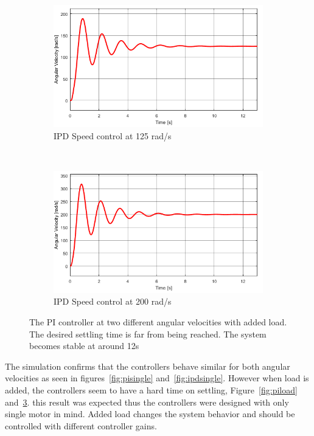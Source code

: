 \begin{figure}[h!]
	\centering
	\begin{subfigure}[b]{0.45\textwidth}
		\includegraphics[width=\textwidth]{graphics/IPD_load125}
		\caption{IPD Speed control at 125 rad/s}
		\label{fig:ipdload125}
	\end{subfigure}
	~ %
	\begin{subfigure}[b]{0.45\textwidth}
		\includegraphics[width=\textwidth]{graphics/IPD_load200}
		\caption{IPD Speed control at 200 rad/s}
		\label{fig:ipdload200}
	\end{subfigure}
	\caption{The PI controller at two different angular velocities with added load. The desired settling time is far from being reached. The system becomes stable at around 12s}\label{fig:ipdload}
\end{figure}

The simulation confirms that the controllers behave similar for both angular velocities as seen in figures~\ref{fig:pisingle} and~\ref{fig:ipdsingle}. However when load is added, the controllers seem to have a hard time on settling, Figure~\ref{fig:piload} and~\ref{fig:ipdload}. this result was expected thus the controllers were designed with only single motor in mind. Added load changes the system behavior and should be controlled with different controller gains.

